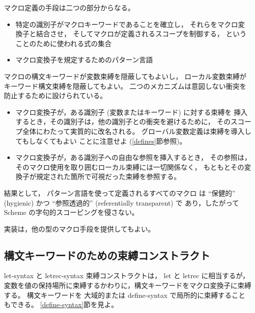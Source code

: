 マクロ定義の手段は二つの部分からなる。

\begin{itemize}
\item 特定の識別子がマクロキーワードであることを確立し，
それらをマクロ変換子と結合させ，
そしてマクロが定義されるスコープを制御する，
ということのために使われる式の集合

\item マクロ変換子を規定するためのパターン言語
\end{itemize}

マクロの構文キーワードが変数束縛を隠蔽してもよいし，
ローカル変数束縛がキーワード構文束縛を隠蔽してもよい。
二つのメカニズムは意図しない衝突を防止するために設けられている。

\begin{itemize}

\item マクロ変換子が，ある識別子 (変数またはキーワード) に対する束縛を
挿入するとき，その識別子は，他の識別子との衝突を避けるために，
そのスコープ全体にわたって実質的に改名される。
グローバル変数定義は束縛を導入してもしなくてもよい
ことに注意せよ (\ref{defines}節参照)。

\item マクロ変換子が，ある識別子への自由な参照を挿入するとき，
その参照は，そのマクロ使用を取り囲むローカル束縛には一切関係なく，
もともとその変換子が規定された箇所で可視だった束縛を参照する。

\end{itemize}

結果として，
パターン言語を使って定義されるすべてのマクロ
は ``保健的'' (hygienic) かつ ``参照透過的'' (referentially transparent) で
あり，したがって Scheme の字句的スコーピングを侵さない。\cite{Kohlbecker86,
hygienic,Bawden88,macrosthatwork,syntacticabstraction}

実装は，他の型のマクロ手段を提供してもよい。

\subsection{構文キーワードのための束縛コンストラクト}
\label{bindsyntax}

{\cf let-syntax} と {\cf letrec-syntax} 束縛コンストラクトは，
{\cf let} と {\cf letrec} に相当するが，
変数を値の保持場所に束縛するかわりに，構文キーワードをマクロ変換子に束縛する。
構文キーワードを
大域的または {\cf define-syntax} で局所的に束縛することもできる。
\ref{define-syntax}節を見よ。

